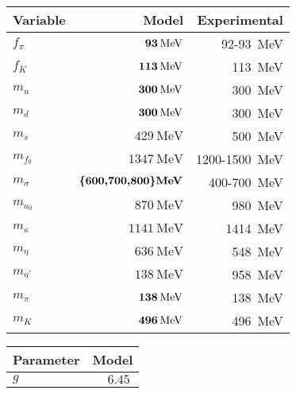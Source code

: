 \begin{table}
\centering
\begin{tabular}{ l r r }
	\toprule
	Variable          & Model                                   & Experimental                            \\
	\midrule
	$f_\pi$           & $\textbf{\SI{93}{\mega\electronvolt}}$  & \SI{92}{}-\SI{93}{\mega\electronvolt}            \\
	$f_K$             & $\textbf{\SI{113}{\mega\electronvolt}}$ & \SI{113}{\mega\electronvolt}                     \\
	\midrule
	$m_u$             & $\textbf{\SI{300}{\mega\electronvolt}}$ & \approx \, \SI{300}{\mega\electronvolt}          \\
	$m_d$             & $\textbf{\SI{300}{\mega\electronvolt}}$ & \approx \, \SI{300}{\mega\electronvolt}          \\
	$m_s$             & $\SI{429}{\mega\electronvolt}$          & \approx \, \SI{500}{\mega\electronvolt}          \\
	\midrule
	$m_{f_0}$         & $\SI{1347}{\mega\electronvolt}$         & \SI{1200}{}-\SI{1500}{\mega\electronvolt}        \\
	$m_\sigma$        & $\textbf{\{600,700,800\}\si{\mega\electronvolt}}$ & \SI{400}{}-\SI{700}{\mega\electronvolt}          \\
	$m_{a_0}$         & $\SI{870}{\mega\electronvolt}$          & \SI{980}{\mega\electronvolt}                     \\
	$m_\kappa$        & $\SI{1141}{\mega\electronvolt}$         & \SI{1414}{\mega\electronvolt}                    \\
	$m_\eta$          & $\SI{636}{\mega\electronvolt}$          & \SI{548}{\mega\electronvolt}                     \\
	$m_{\eta'}$       & $\SI{138}{\mega\electronvolt}$          & \SI{958}{\mega\electronvolt}                     \\
	$m_\pi$           & $\textbf{\SI{138}{\mega\electronvolt}}$ & \SI{138}{\mega\electronvolt}                     \\
	$m_K$             & $\textbf{\SI{496}{\mega\electronvolt}}$ & \SI{496}{\mega\electronvolt}                     \\
	\bottomrule
\end{tabular}
\hfill
\begin{tabular}{ l r }
	\toprule
	Parameter   & Model                                 \\
	\midrule
	$g$         & $\SI{6.45}{}$                         \\

\end{tabular}
\end{table}
